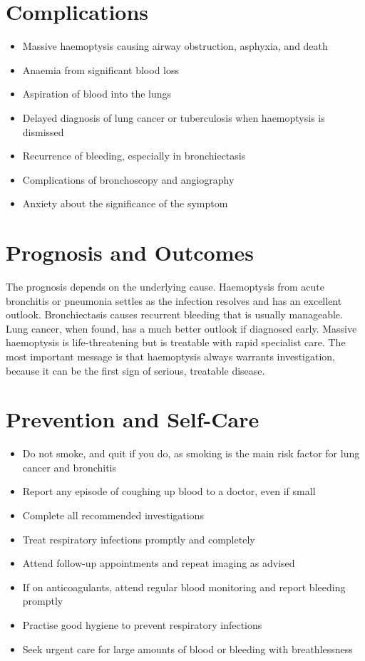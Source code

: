 \section*{Complications}
\begin{itemize}
    \item Massive haemoptysis causing airway obstruction, asphyxia, and death
    \item Anaemia from significant blood loss
    \item Aspiration of blood into the lungs
    \item Delayed diagnosis of lung cancer or tuberculosis when haemoptysis is dismissed
    \item Recurrence of bleeding, especially in bronchiectasis
    \item Complications of bronchoscopy and angiography
    \item Anxiety about the significance of the symptom
\end{itemize}

\section*{Prognosis and Outcomes}
The prognosis depends on the underlying cause. Haemoptysis from acute bronchitis or pneumonia settles as the infection resolves and has an excellent outlook. Bronchiectasis causes recurrent bleeding that is usually manageable. Lung cancer, when found, has a much better outlook if diagnosed early. Massive haemoptysis is life-threatening but is treatable with rapid specialist care. The most important message is that haemoptysis always warrants investigation, because it can be the first sign of serious, treatable disease.

\section*{Prevention and Self-Care}
\begin{itemize}
    \item Do not smoke, and quit if you do, as smoking is the main risk factor for lung cancer and bronchitis
    \item Report any episode of coughing up blood to a doctor, even if small
    \item Complete all recommended investigations
    \item Treat respiratory infections promptly and completely
    \item Attend follow-up appointments and repeat imaging as advised
    \item If on anticoagulants, attend regular blood monitoring and report bleeding promptly
    \item Practise good hygiene to prevent respiratory infections
    \item Seek urgent care for large amounts of blood or bleeding with breathlessness
\end{itemize}

